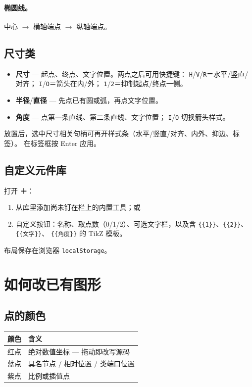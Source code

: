 \documentclass[a4paper]{ltxdoc}
\newcommand{\ui}[1]{\textbf{#1}}
\newcommand{\key}[1]{\texttt{#1}}
\begin{document}
\paragraph{椭圆线。}
中心 $\rightarrow$ 横轴端点 $\rightarrow$ 纵轴端点。

\subsection{尺寸类}
\begin{itemize}[nosep]
  \item \ui{尺寸} --- 起点、终点、文字位置。两点之后可用快捷键：
        \key{H}/\key{V}/\key{R}＝水平/竖直/对齐；
        \key{I}/\key{O}＝箭头在内/外；
        \key{1}/\key{2}＝抑制起点/终点一侧。
  \item \ui{半径}/\ui{直径} --- 先点已有圆或弧，再点文字位置。
  \item \ui{角度} --- 点第一条直线、第二条直线、文字位置；
        \key{I}/\key{O} 切换箭头样式。
\end{itemize}
放置后，选中尺寸相关句柄可再开样式条（水平/竖直/对齐、内外、抑边、标签）。
在标签框按 Enter 应用。

\subsection{自定义元件库}
打开 \ui{＋}：
\begin{enumerate}[nosep]
  \item 从库里添加尚未钉在栏上的内置工具；或
  \item 自定义按钮：名称、取点数（0/1/2）、可选文字栏，以及含
        \texttt{\{\{1\}\}}、\texttt{\{\{2\}\}}、\texttt{\{\{文字\}\}}、
        \texttt{\{\{角度\}\}} 的 TikZ 模板。
\end{enumerate}
布局保存在浏览器 \texttt{localStorage}。

\section{如何改已有图形}
\label{sec:edit}

\subsection{点的颜色}
\begin{center}
\begin{tabular}{@{}ll@{}}
\toprule
颜色 & 含义 \\
\midrule
红点 & 绝对数值坐标 --- 拖动即改写源码 \\
蓝点 & 具名节点 / 相对位置 / 类端口位置 \\
紫点 & 比例或插值点 \\
\bottomrule
\end{tabular}
\end{center}
\end{document}
